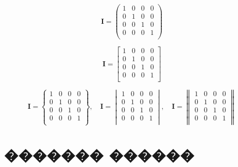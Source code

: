 \documentclass[a4paper,11pt]{article}
\begin{document}
	\quad
	
	\begin{equation}
	\textbf{I} = 
	\begin{pmatrix}
	1&0&0&0 \\
	0&1&0&0 \\
	0&0&1&0 \\
	0&0&0&1 \\
	\end{pmatrix}
	\end{equation}
	
	\quad
	
	\begin{equation}
	\textbf{I} = 
	\begin{bmatrix}
	1&0&0&0 \\
	0&1&0&0 \\
	0&0&1&0 \\
	0&0&0&1 \\
	\end{bmatrix}
	\end{equation}
	
	\quad
	
	\begin{equation}
	\textbf{I} =
	\begin{Bmatrix} 
	1&0&0&0 \\
	0&1&0&0 \\
	0&0&1&0 \\
	0&0&0&1 \\
	\end{Bmatrix},\quad
	\textbf{I} =
	\begin{vmatrix} 
	1&0&0&0 \\
	0&1&0&0 \\
	0&0&1&0 \\
	0&0&0&1 \\
	\end{vmatrix},\quad
	\textbf{I} =
	\begin{Vmatrix} 
	1&0&0&0 \\
	0&1&0&0 \\
	0&0&1&0 \\
	0&0&0&1 \\
	\end{Vmatrix}
	\end{equation}

\vspace{20pt}

\section{������� ������}
\end{document}
